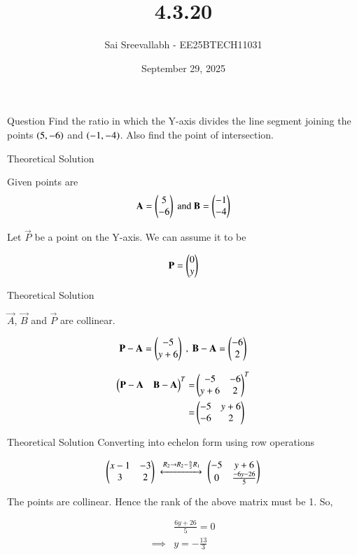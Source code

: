 \documentclass{beamer}
\title 
{4.3.20}
\date{September 29, 2025}
\author 
{Sai Sreevallabh - EE25BTECH11031}
\begin{document}
\frame{\titlepage}
\begin{frame}{Question}
Find the ratio in which the Y-axis divides the line segment joining the points $\left(5,-6\right)$ and $\left(-1,-4\right)$. Also find the point of intersection. \\
\end{frame}



\begin{frame}{Theoretical Solution}

Given points are\\
\begin{align}
    \mathbf{A}=\begin{pmatrix}5\\-6\end{pmatrix} \ \text{and}\  \mathbf{B}=\begin{pmatrix}-1\\-4\end{pmatrix}
\end{align}

Let $\vec{P}$ be a point on the Y-axis. We can assume it to be

\begin{align}
    \mathbf{P}=\begin{pmatrix}0\\y\end{pmatrix}
\end{align}

\end{frame}

\begin{frame}{Theoretical Solution}

$\vec{A}$, $\vec{B}$ and $\vec{P}$ are collinear. 

\begin{align}
    \vec{P}-\vec{A}=\myvec{-5 \\ y+6} \ , \ 
    \vec{B}-\vec{A}=\myvec{-6\\2}  
\end{align}

\begin{align}
    \begin{pmatrix}\mathbf{P}-\mathbf{A} & \mathbf{B}-\mathbf{A}\end{pmatrix}^T =& \begin{pmatrix}-5 & -6\\ y+6 & 2\end{pmatrix}^T\\
    =& \begin{pmatrix}-5 & y+6 \\ -6 & 2\end{pmatrix}
\end{align}

\end{frame}

\begin{frame}{Theoretical Solution}
Converting into echelon form using row operations

\begin{align}
    \begin{pmatrix}x-1 & -3 \\ 3 & 2\end{pmatrix}\ \xleftrightarrow[]{R_2 \to R_2-\frac{6}{5}R_1} \  \begin{pmatrix}-5 & y+6 \\ 0 & \frac{-6y-26}{5}\end{pmatrix}
\end{align}

The points are collinear. Hence the rank of the above matrix must be 1. So, 

\begin{align}
    &\frac{6y+26}{5} = 0\\
    \implies& y=-\frac{13}{3}
\end{align}\\

\end{frame}
\end{document}
